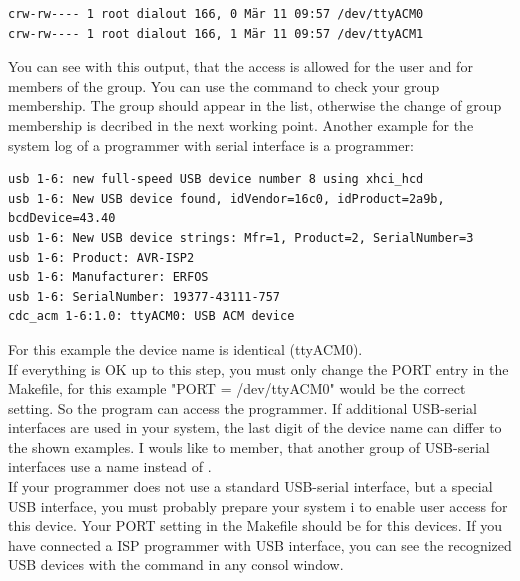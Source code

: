 \begin{footnotesize} \begin{verbatim}
crw-rw---- 1 root dialout 166, 0 Mär 11 09:57 /dev/ttyACM0
crw-rw---- 1 root dialout 166, 1 Mär 11 09:57 /dev/ttyACM1
\end{verbatim} \end{footnotesize}
You can see with this output, that the access is allowed for the user 
and for members of the  group.
You can use the  command to check your group membership.
The group  should appear in the list,
otherwise the change of group membership is decribed in the
next working point.
Another example for the system log of a programmer with serial interface
is a  programmer:

\begin{footnotesize} \begin{verbatim}
usb 1-6: new full-speed USB device number 8 using xhci_hcd
usb 1-6: New USB device found, idVendor=16c0, idProduct=2a9b, bcdDevice=43.40
usb 1-6: New USB device strings: Mfr=1, Product=2, SerialNumber=3
usb 1-6: Product: AVR-ISP2
usb 1-6: Manufacturer: ERFOS
usb 1-6: SerialNumber: 19377-43111-757
cdc_acm 1-6:1.0: ttyACM0: USB ACM device
\end{verbatim} \end{footnotesize}

For this example the device name is identical (ttyACM0).\\

If everything is OK up to this step, you must only change the PORT entry in the Makefile,
for this example "PORT = /dev/ttyACM0" would be the correct setting.
So the  program can access the programmer.
If additional USB-serial interfaces are used in your system,
the last digit of the device name can differ to the shown examples.
I wouls like to member, that another group of USB-serial interfaces
use a name  instead of .\\

If your programmer does not use a standard USB-serial interface,
but a special USB interface,
you must probably prepare your system i to enable user access for this device.
Your PORT setting in the Makefile should be  for this devices.
If you have connected a ISP programmer with USB interface,
you can see the recognized USB devices with the command 
in any consol window.

